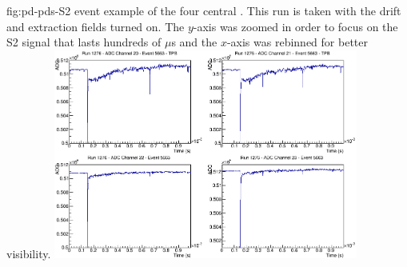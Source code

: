 \begin{dunefigure}{fig:pd-pds-S2} { event example of the four central . %
This run is taken with the drift and extraction fields turned on. %
The $y$-axis was zoomed in order to focus on the S2 signal that lasts hundreds of $\mu$s and the $x$-axis was rebinned for better visibility.}
\includegraphics[width=0.75\textwidth]{graphics/dppd_S2.png}
\end{dunefigure}
